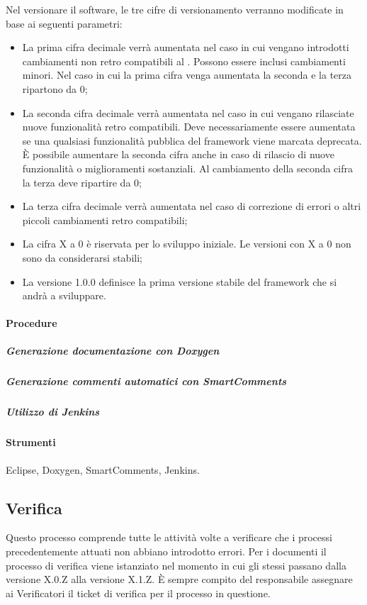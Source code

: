 Nel versionare il software, le tre cifre di versionamento verranno modificate in base ai seguenti parametri:
\begin{itemize}
\item La prima cifra decimale verrà aumentata nel caso in cui vengano introdotti cambiamenti non retro compatibili al . Possono essere inclusi cambiamenti minori. Nel caso in cui la prima cifra venga aumentata la seconda e la terza ripartono da 0;
\item La seconda cifra decimale verrà aumentata nel caso in cui vengano rilasciate nuove funzionalità retro compatibili. Deve necessariamente essere aumentata se una qualsiasi funzionalità pubblica del framework viene marcata deprecata. È possibile aumentare la seconda cifra anche in caso di rilascio di nuove funzionalità o miglioramenti sostanziali. Al cambiamento della seconda cifra la terza deve ripartire da 0;
\item La terza cifra decimale verrà aumentata nel caso di correzione di errori o altri piccoli cambiamenti retro compatibili;
\item La cifra X a 0 è riservata per lo sviluppo iniziale. Le versioni con X a 0 non sono da considerarsi stabili;
\item La versione 1.0.0 definisce la prima versione stabile del framework che si andrà a sviluppare.
\end{itemize}


\paragraph{Procedure}

\subparagraph{Generazione documentazione con Doxygen}
\subparagraph{Generazione commenti automatici con SmartComments}
\subparagraph{Utilizzo di Jenkins}



\paragraph{Strumenti}

Eclipse, Doxygen, SmartComments, Jenkins.

\subsection{Verifica}
Questo processo comprende tutte le attività volte a verificare che i processi precedentemente attuati non abbiano introdotto errori.
Per i documenti il processo di verifica viene istanziato nel momento in cui gli stessi passano dalla versione X.0.Z alla versione X.1.Z. 
È sempre compito del responsabile assegnare ai Verificatori il ticket di verifica per il processo in questione.

